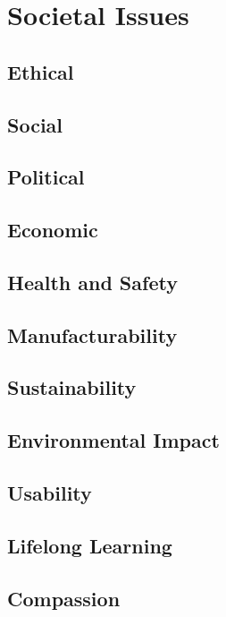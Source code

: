 \chapter{Societal Issues}

\section*{Ethical}

\section*{Social}

\section*{Political}

\section*{Economic}

\section*{Health and Safety}

\section*{Manufacturability}

\section*{Sustainability}

\section*{Environmental Impact}

\section*{Usability}

\section*{Lifelong Learning}

\section*{Compassion}